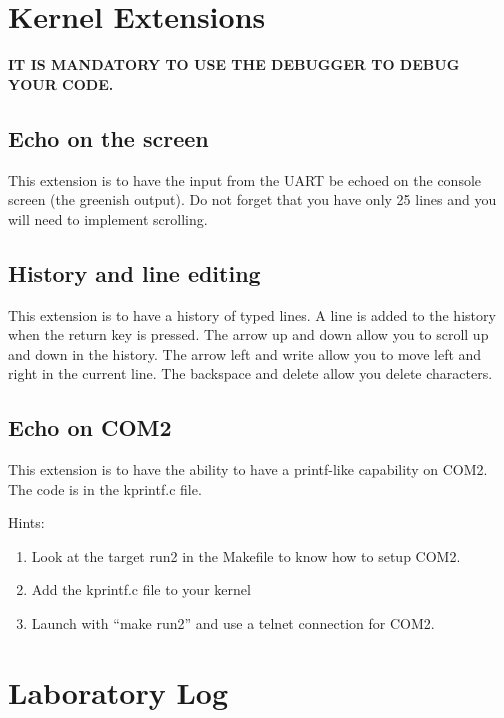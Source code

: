 \documentclass[10]{article}
\begin{document}
\section{Kernel Extensions}

{\bf IT IS MANDATORY TO USE THE DEBUGGER TO DEBUG YOUR CODE.}

\subsection{Echo on the screen}

This extension is to have the input from the UART be 
echoed on the console screen (the greenish output).
Do not forget that you have only 25 lines and you will
need to implement scrolling.

\subsection{History and line editing}

This extension is to have a history of typed lines.
A line is added to the history when the return key is pressed.
The arrow up and down allow you to scroll up and down in the history.
The arrow left and write allow you to move left and right in the current line.
The backspace and delete allow you delete characters.

\subsection{Echo on COM2}

This extension is to have the ability to have a printf-like 
capability on COM2. The code is in the kprintf.c file.

\noindent Hints: 
\begin{enumerate}
\item 
Look at the target run2 in the Makefile to know how
to setup COM2.
\item
Add the kprintf.c file to your kernel
\item
Launch with ``make run2'' and use a telnet connection
for COM2.
\end{enumerate}


\section{Laboratory Log}
\end{document}

